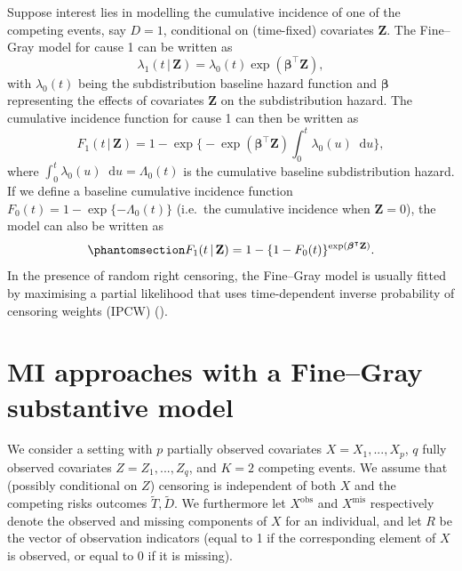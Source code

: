 \documentclass[
  letterpaper,
  DIV=11,
  numbers=noendperiod]{scrreprt}
\newcommand{\given}{\,|\,}
\newcommand\diff{\mathop{}\!\mathrm{d}}
\begin{document}
Suppose interest lies in modelling the cumulative incidence of one of
the competing events, say \(D = 1\), conditional on (time-fixed)
covariates \(\mathbf{Z}\). The Fine--Gray model for cause 1 can be
written as \begin{equation*}
    \lambda_1(t \given \mathbf{Z}) = \lambda_{0}(t)\exp(\boldsymbol{\beta}^\intercal \mathbf{Z}),
\end{equation*} with \(\lambda_{0}(t)\) being the subdistribution
baseline hazard function and \(\boldsymbol{\beta}\) representing the
effects of covariates \(\mathbf{Z}\) on the subdistribution hazard. The
cumulative incidence function for cause 1 can then be written as
\begin{equation*}
    F_1(t \given \mathbf{Z}) = 1 - \exp \Biggl\{ -\exp(\boldsymbol{\beta}^\intercal \mathbf{Z}) \int_{0}^{t} \lambda_{0}(u)\diff u \Biggr\},
\end{equation*} where
\(\int_{0}^{t} \lambda_{0}(u)\diff u = \Lambda_0(t)\) is the cumulative
baseline subdistribution hazard. If we define a baseline cumulative
incidence function \(F_{0}(t) = 1 - \exp\{-\Lambda_0(t)\}\) (i.e.~the
cumulative incidence when \(\mathbf{Z} = 0\)), the model can also be
written as \begin{equation}\phantomsection\label{eq-cuminc-comp}{
F_1(t \given \mathbf{Z}) = 1 - \{1 - F_{0}(t)\}^{\exp(\boldsymbol{\beta}^\intercal \mathbf{Z})}.
}\end{equation} In the presence of random right censoring, the
Fine--Gray model is usually fitted by maximising a partial likelihood
that uses time-dependent inverse probability of censoring weights (IPCW)
().

\section{MI approaches with a Fine--Gray substantive
model}\label{sec-methods}

We consider a setting with \(p\) partially observed covariates
\(X = X_1,...,X_p\), \(q\) fully observed covariates
\(Z = Z_1,...,Z_q\), and \(K = 2\) competing events. We assume that
(possibly conditional on \(Z\)) censoring is independent of both \(X\)
and the competing risks outcomes \(\tilde{T}, \tilde{D}\). We
furthermore let \(X^{\text{obs}}\) and \(X^{\text{mis}}\) respectively
denote the observed and missing components of \(X\) for an individual,
and let \(R\) be the vector of observation indicators (equal to 1 if the
corresponding element of \(X\) is observed, or equal to 0 if it is
missing).
\end{document}
